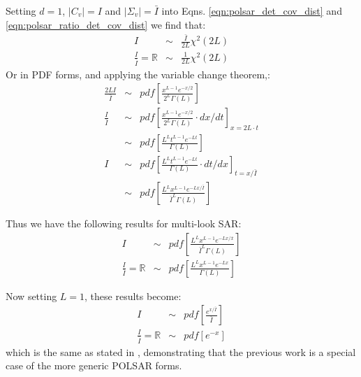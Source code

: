 \documentclass[journal]{IEEEtran}
\begin{document}
Setting $d=1$, $|C_v|=I$ and $|\Sigma_v|=\bar{I}$ into Eqns. \ref{eqn:polsar_det_cov_dist} and \ref{eqn:polsar_ratio_det_cov_dist}
we find that:
\begin{eqnarray*}
  I &\sim& \frac{\bar{I}}{2L} \chi^2(2L)  \\
  \frac{I}{\bar{I}} = \mathbb{R} &\sim& \frac{1}{2L}  \chi^2(2L)   
\end{eqnarray*}
Or in PDF forms, and applying the variable change theorem,:
\begin{eqnarray*}
    \frac{2L I}{\bar{I}} &\sim& pdf \left[ \frac{x^{L-1}e^{-x/2}}{2^L \Gamma(L)} \right] \\
  \frac{I}{\bar{I}} &\sim& pdf \left[ \frac{x^{L-1}e^{-x/2}}{2^L \Gamma(L)} \cdot dx/dt \right]_{x=2L \cdot t} \\
    &\sim& pdf \left[ \frac{ L^{L} t^{L-1} e^{-Lt}}{ \Gamma(L)} \right] \\
  I &\sim& pdf \left[ \frac{ L^{L} t^{L-1} e^{-Lt}}{ \Gamma(L)} \cdot dt/dx \right]_{t=x/\bar{I}}  \\
    &\sim& pdf \left[ \frac{ L^{L} x^{L-1} e^{-Lx/\bar{I}}}{ \bar{I}^{L}\Gamma(L)} \right]
\end{eqnarray*}

Thus we have the following results for multi-look SAR:
\begin{eqnarray}
    I &\sim& pdf \left[ \frac{ L^{L} x^{L-1} e^{-Lx/\bar{x}}}{ \bar{I}^{L}\Gamma(L)} \right] \label{eqn:multi_look_SAR_intensity_dist} \\
    \frac{I}{\bar{I}} = \mathbb{R} &\sim& pdf \left[ \frac{ L^{L} x^{L-1} e^{-Lx}}{ \Gamma(L)} \label{eqn:multi_look_SAR_ratio_dist} \right] 
\end{eqnarray}

Now setting $L=1$, these results become:
\begin{eqnarray}
    I &\sim& pdf \left[ \frac{ e^{x/\bar{I}}}{ \bar{I}} \right] \\
    \frac{I}{\bar{I}} = \mathbb{R} &\sim& pdf \left[ e^{-x} \right] 
\end{eqnarray}
which is the same as stated in \cite{Le_2013_TGRS_SAR_MSE}, demonstrating that the previous work is a special case of the more generic POLSAR forms.
\end{document}
